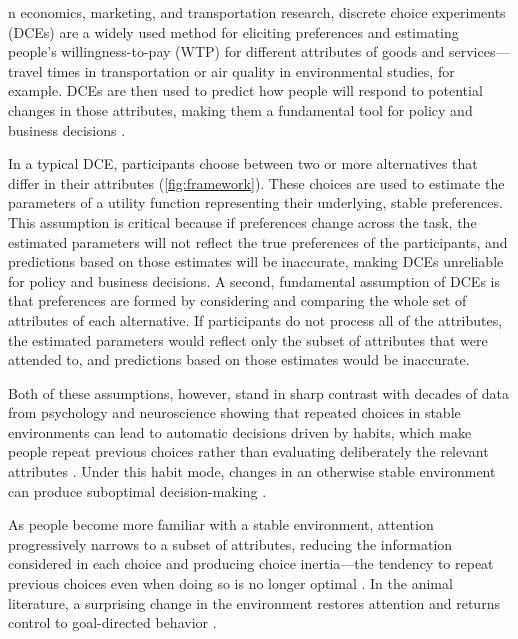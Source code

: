 n economics, marketing, and transportation research, discrete choice experiments (DCEs) are a widely used method for eliciting preferences and estimating people's willingness-to-pay (WTP) for different attributes of goods and services---travel times in transportation or air quality in environmental studies, for example. DCEs are then used to predict how people will respond to potential changes in those attributes, making them a fundamental tool for policy and business decisions \cite{mcfadden1974, train2009}.

In a typical DCE, participants choose between two or more alternatives that differ in their attributes (\autoref{fig:framework}). These choices are used to estimate the parameters of a utility function representing their underlying, stable preferences. This assumption is critical because if preferences change across the task, the estimated parameters will not reflect the true preferences of the participants, and predictions based on those estimates will be inaccurate, making DCEs unreliable for policy and business decisions. A second, fundamental assumption of DCEs is that preferences are formed by considering and comparing the whole set of attributes of each alternative. If participants do not process all of the attributes, the estimated parameters would reflect only the subset of attributes that were attended to, and predictions based on those estimates would be inaccurate.  

Both of these assumptions, however, stand in sharp contrast with decades of data from psychology and neuroscience showing that repeated choices in stable environments can lead to automatic decisions driven by habits, which make people repeat previous choices rather than evaluating deliberately the relevant attributes \cite{adamsDickinson1981, dickinson1985, dolanDayan2013, perezDickinson2020, pool2022}. Under this habit mode, changes in an otherwise stable environment can produce suboptimal decision-making \cite{hardwick2019, pool2022,henriquezJara2025}. 

As people become more familiar with a stable environment, attention progressively narrows to a subset of attributes, reducing the information considered in each choice and producing choice inertia---the tendency to repeat previous choices even when doing so is no longer optimal \cite{bouton2020, thrailkill2018}. In the animal literature, a surprising change in the environment restores attention and returns control to goal-directed behavior \cite{daw2005, lee2014, bouton2024}.


